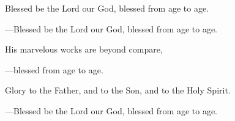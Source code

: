 \responsory
\begin{hangpar}

Blessed be the Lord our God, blessed from age to age.

{\color{red}---\thinspace}Blessed be the Lord our God, blessed from age to age.

\medskip His marvelous works are beyond compare,

{\color{red}---\thinspace}blessed from age to age.

\medskip Glory to the Father, and to the Son, and to the Holy Spirit.

{\color{red}---\thinspace}Blessed be the Lord our God, blessed from age to age.
\end{hangpar}
